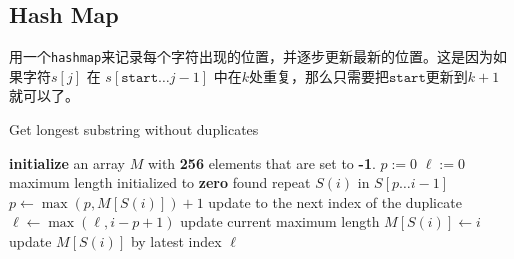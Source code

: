 \subsection{Hash Map}
用一个\texttt{hashmap}来记录每个字符出现的位置，并逐步更新最新的位置。这是因为如果字符\quad $s[j]$ \quad 在 \quad $s[\mathtt{start}\ldots j-1]$ \quad 中在\quad$k$\quad 处重复，那么只需要把\quad$\mathtt{start}$\quad 更新到\quad$k+1$\quad 就可以了。
\begin{algorithm}[H]
\caption{Get longest substring without duplicates}
\begin{algorithmic}[1]
\State \textbf{initialize} an array $M$ with \textbf{256} elements that are set to \textbf{-1}.
\State $p := 0 $
\State $\ell:= 0$ \Comment maximum length initialized to \textbf{zero}
 \Comment found repeat $S(i)$ in $S[p\ldots i-1]$
\State $p \gets \max(p, M[S(i)]) + 1$ \Comment update to the next index of the duplicate
\EndIf
\State $\ell \gets \max(\ell, i - p +1 )$ \Comment update current maximum length
\State $M[S(i)] \gets i$ \Comment update $M[S(i)]$ by latest index
\EndFor
\State \Return $\ell$
\EndProcedure
\Statex
\end{algorithmic}
\end{algorithm}

